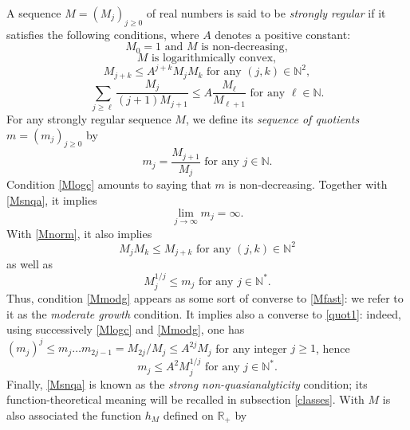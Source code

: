 \documentclass[a4paper]{amsart}
\theoremstyle{plain}
\theoremstyle{definition}
\theoremstyle{remark}
\begin{document}
A sequence $ M=(M_j)_{j\geq 0} $ of real numbers is said to be
\emph{strongly regular}
if it satisfies the
following conditions, where $ A $ denotes a
positive constant:
\begin{equation}\label{Mnorm}
M_0=1 \text{ and }M\text{ is non-decreasing},
\end{equation}
\begin{equation}\label{Mlogc}
M \text{ is logarithmically convex},
\end{equation}
\begin{equation}\label{Mmodg}
M_{j+k}\leq A^{j+k}M_jM_k\text{ for any }(j,k)\in\mathbb{N}^2,
\end{equation}
\begin{equation}\label{Msnqa}
\sum_{j\geq\ell}\frac{M_j}{(j+1)M_{j+1}}\leq A\frac{M_\ell}{M_{\ell+1}}
\text{ for any }\ell\in\mathbb{N}.
\end{equation}
For any strongly regular sequence $ M $, we define its \emph{sequence of quotients}
$ m=(m_j)_{j\geq 0} $ by 
\begin{equation}\label{Mquot}
m_j=\frac{M_{j+1}}{M_j}
\text{ for any } j\in\mathbb{N}.
\end{equation}
Condition \eqref{Mlogc} amounts to saying that $ m $ 
is non-decreasing. Together with \eqref{Msnqa}, it implies
\begin{equation}\label{Multra}
\lim_{j\rightarrow\infty} m_j=\infty. 
\end{equation}
With \eqref{Mnorm}, it also implies
\begin{equation}\label{Mfast}
M_jM_k\leq M_{j+k}\text{ for any }(j,k)\in\mathbb{N}^2
\end{equation}
as well as
\begin{equation}\label{quot1}
M_j^{1/j}\leq 
m_j\text{ for any }j\in\mathbb{N}^*.
\end{equation} 
Thus, condition \eqref{Mmodg} appears as some sort of converse to \eqref{Mfast}: we refer to it as the \emph{moderate growth} condition.
It implies also a converse to \eqref{quot1}: indeed, using successively \eqref{Mlogc} and \eqref{Mmodg}, one has $ (m_j)^j\leq m_j\dots m_{2j-1}=M_{2j}/M_j\leq A^{2j} M_j $ for any integer $ j\geq 1 $, hence
\begin{equation}\label{quot2}
m_j\leq A^2 M_j^{1/j}\text{ for any } j\in\mathbb{N}^*.
\end{equation}
Finally, \eqref{Msnqa} is known as the \emph{strong non-quasianalyticity} condition;
its function-theoretical meaning
will be recalled in subsection \ref{classes}.
With $ M $ is also associated the function $ h_M $ defined on $ \mathbb{R}_+ $ by
\end{document}
